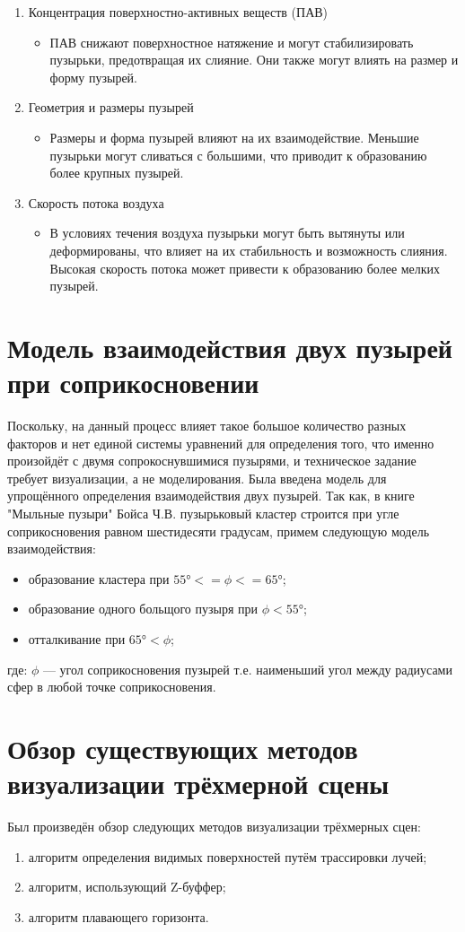 \begin{enumerate}[label={\arabic*.}]
	\item Концентрация поверхностно-активных веществ (ПАВ)
	\begin{itemize}	
		\item ПАВ снижают поверхностное натяжение и могут стабилизировать пузырьки, предотвращая их слияние. Они также могут влиять на размер и форму пузырей.
	\end{itemize}
	\item Геометрия и размеры пузырей
	\begin{itemize}	
		\item Размеры и форма пузырей влияют на их взаимодействие. Меньшие пузырьки могут сливаться с большими, что приводит к образованию более крупных пузырей.
	\end{itemize}	
	\item Скорость потока воздуха
	\begin{itemize}	
		\item В условиях течения воздуха пузырьки могут быть вытянуты или деформированы, что влияет на их стабильность и возможность слияния. Высокая скорость потока может привести к образованию более мелких пузырей.
	\end{itemize}	
\end{enumerate}

\section{Модель взаимодействия двух пузырей при соприкосновении}
Поскольку, на данный процесс влияет такое большое количество разных факторов и нет единой системы уравнений для определения того, что именно произойдёт с двумя сопрокоснувшимися пузырями, и техническое задание требует визуализации, а не моделирования. Была введена модель для упрощённого определения взаимодействия двух пузырей. Так как, в книге "Мыльные пузыри" \cite{boys} Бойса Ч.В. пузырьковый кластер строится при угле соприкосновения равном шестидесяти градусам, примем следующую модель взаимодействия:
\begin{itemize}	
	\item образование кластера при $ 55° <= \phi <= 65°$;
	\item образование одного больщого пузыря при $\phi < 55°$;
	\item отталкивание при $ 65° < \phi$;
\end{itemize}
где: $\phi$ --- угол соприкосновения пузырей т.е. наименьший угол между радиусами сфер в любой точке соприкосновения.
	
\section{Обзор существующих методов визуализации трёхмерной сцены}
Был произведён обзор следующих методов визуализации трёхмерных сцен:
\begin{enumerate}[label={\arabic*.}]
	\item алгоритм определения видимых поверхностей путём трассировки лучей;
	\item алгоритм, использующий Z-буффер;
	\item алгоритм плавающего горизонта.
\end{enumerate}

